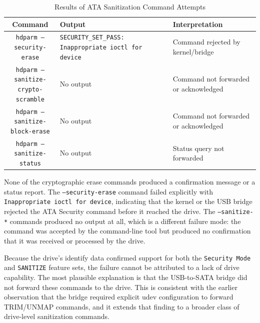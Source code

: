 \begin{table}[H]
    \centering
    \caption{Results of ATA Sanitization Command Attempts}
    \label{tab:ata-sanitize-results}
    
    \begin{tabularx}{\textwidth}{c X X}
        \toprule
        \textbf{Command} & \textbf{Output} & \textbf{Interpretation} \\
        \midrule
        
        \makecell[l]{\texttt{hdparm --security-}\\
                     \texttt{erase}} &
        \texttt{SECURITY\_SET\_PASS: Inappropriate ioctl for device} &
        Command rejected by kernel/bridge \\
        
        \makecell[l]{\texttt{hdparm --sanitize-}\\
                     \texttt{crypto-scramble}} &
        No output &
        Command not forwarded or acknowledged \\
        
        \makecell[l]{\texttt{hdparm --sanitize-}\\
                     \texttt{block-erase}} &
        No output &
        Command not forwarded or acknowledged \\
        
        \makecell[l]{\texttt{hdparm --sanitize-}\\
                     \texttt{status}} &
        No output &
        Status query not forwarded \\
        
        \bottomrule
    \end{tabularx}
\end{table}


None of the cryptographic erase commands produced a confirmation message or a status report. The \texttt{--security-erase} command failed explicitly with 
\texttt{Inappropriate ioctl for device}, indicating that the kernel or the USB bridge rejected the ATA Security command before it reached the drive. The 
\texttt{--sanitize-*} commands produced no output at all, which is a different failure mode: the command was accepted by the command-line tool but produced no 
confirmation that it was received or processed by the drive.

Because the drive's identify data confirmed support for both the \texttt{Security Mode} and \texttt{SANITIZE} feature sets, the failure cannot be attributed to a lack
of drive capability. The most plausible explanation is that the USB-to-SATA bridge did not forward these commands to the drive. This is consistent with the earlier 
observation that the bridge required explicit udev configuration to forward TRIM/UNMAP commands, and it extends that finding to a broader class of drive-level 
sanitization commands.

